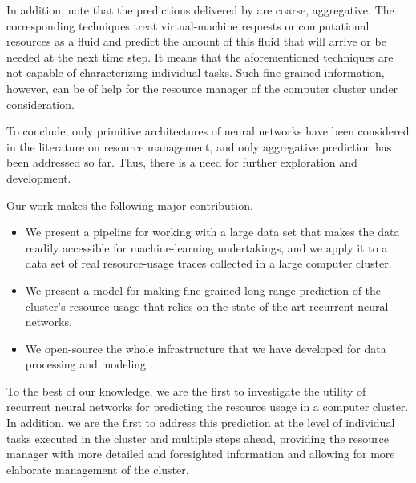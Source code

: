 In addition, note that the predictions delivered by \cite{dabbagh2015,
ismaeel2015, cao2014} are coarse, aggregative. The corresponding techniques
treat virtual-machine requests or computational resources as a fluid and predict
the amount of this fluid that will arrive or be needed at the next time step. It
means that the aforementioned techniques are not capable of characterizing
individual tasks. Such fine-grained information, however, can be of help for the
resource manager of the computer cluster under consideration.

To conclude, only primitive architectures of neural networks have been
considered in the literature on resource management, and only aggregative
prediction has been addressed so far. Thus, there is a need for further
exploration and development.

Our work makes the following major contribution.
\begin{itemize}
\item We present a pipeline for working with a large data set that makes the
data readily accessible for machine-learning undertakings, and we apply it to a
data set of real resource-usage traces collected in a large computer cluster.

\item We present a model for making fine-grained long-range prediction of the
cluster's resource usage that relies on the state-of-the-art recurrent neural
networks.

\item We open-source the whole infrastructure that we have developed for data
processing and modeling \cite{sources}.
\end{itemize}
To the best of our knowledge, we are the first to investigate the utility of
recurrent neural networks for predicting the resource usage in a computer
cluster. In addition, we are the first to address this prediction at the level
of individual tasks executed in the cluster and multiple steps ahead, providing
the resource manager with more detailed and foresighted information and allowing
for more elaborate management of the cluster.
